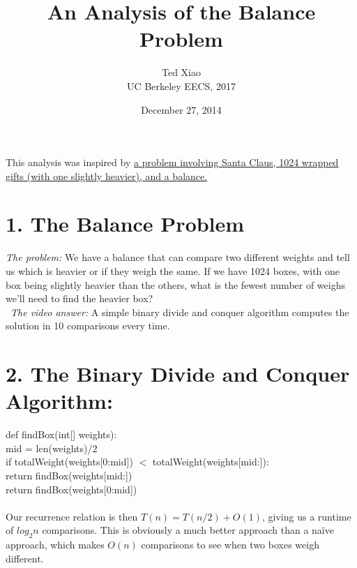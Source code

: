 \documentclass[11pt]{article}
\title{An Analysis of the Balance Problem}
\date{December 27, 2014}
\author{Ted Xiao\\ UC Berkeley EECS, 2017}
\begin{document}
\maketitle

This analysis was inspired by \href{https://www.youtube.com/watch?v=wVPCT1VjySA}{a problem involving Santa Claus, 1024 wrapped gifts (with one slightly heavier), and a balance.}\\
 
\section*{1. The Balance Problem}
\textit{The problem:} We have a balance that can compare two different weights and tell us which is heavier or if they weigh the same. If we have 1024 boxes, with one box being slightly heavier than the others, what is the fewest number of weighs we'll need to find the heavier box?\\\
\indent\textit{The video answer:} A simple binary divide and conquer algorithm computes the solution in 10 comparisons every time. \\
\section*{2. The Binary Divide and Conquer Algorithm:} 
def findBox(int[] weights):\\
\indent mid = len(weights)/2\\
\indent if totalWeight(weights[0:mid]) $<$ totalWeight(weights[mid:]):\\
\indent \indent	return findBox(weights[mid:])\\
\indent	return findBox(weights[0:mid])\\\\
\newline
\indent Our recurrence relation is then $T(n) = T(n/2) + O(1)$, giving us a runtime of $log_2{n}$ comparisons. This is obviously a much better approach than a naïve approach, which makes $O(n)$ comparisons to see when two boxes weigh different. 
\newline 
\end{document}
